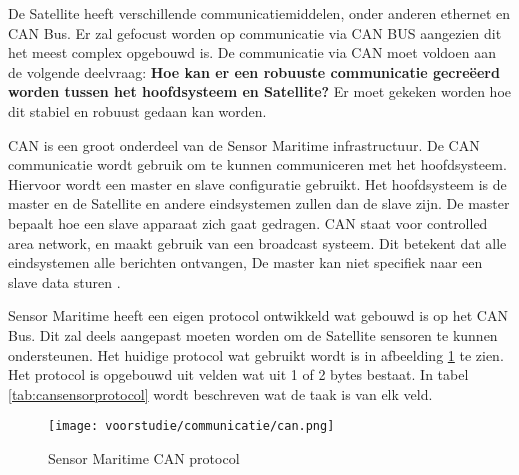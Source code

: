 De Satellite heeft verschillende communicatiemiddelen, onder anderen ethernet en CAN Bus. Er zal gefocust worden op communicatie via CAN BUS aangezien dit het meest complex opgebouwd is.  De communicatie via CAN moet voldoen aan de volgende deelvraag: \textbf{Hoe kan er een robuuste communicatie gecreëerd worden tussen het hoofdsysteem en Satellite?} Er moet gekeken worden hoe dit stabiel en robuust gedaan kan worden.\newline


\noindent CAN is een groot onderdeel van de Sensor Maritime infrastructuur. De CAN communicatie wordt gebruik om te kunnen communiceren met het hoofdsysteem. Hiervoor wordt een master en slave configuratie gebruikt. Het hoofdsysteem is de master en de Satellite en andere eindsystemen zullen dan de slave zijn. De master bepaalt hoe een slave apparaat zich gaat gedragen. CAN staat voor controlled area network, en maakt gebruik van een broadcast systeem. Dit betekent dat alle eindsystemen alle berichten ontvangen, De master kan niet specifiek naar een slave data sturen \autocite{can}. \newline

\noindent Sensor Maritime heeft een eigen protocol ontwikkeld wat gebouwd is op het CAN Bus. Dit zal deels aangepast moeten worden om de Satellite sensoren te kunnen ondersteunen. Het huidige protocol wat gebruikt wordt is in afbeelding \ref{fig:canprotocol} te zien. Het protocol is opgebouwd uit velden wat uit 1 of 2 bytes bestaat. In tabel \ref{tab:cansensorprotocol} wordt beschreven wat de taak is van elk veld.
\begin{figure}[h!]
	\label{fig:canprotocol}
	\texttt{[image: voorstudie/communicatie/can.png]}
	\caption{Sensor Maritime CAN protocol}
\end{figure}


